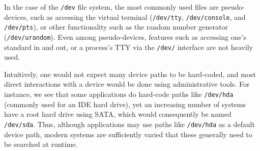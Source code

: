 


In the case of the {\tt /dev} file system, the most commonly used files are pseudo-devices, such as accessing
the virtual terminal ({\tt /dev/tty}, {\tt /dev/console}, and {\tt /dev/pts}), or other functionality 
such as the random number generator ({\tt /dev/urandom}).
Even among pseudo-devices, features such as accessing one's standard in and out, or a process's TTY
via the {\tt /dev/} interface are not heavily used.

Intuitively, one would not expect many device paths to be hard-coded, and most direct interactions 
with a device would be done using administrative tools.
For instance, we see that some applications do hard-code paths like {\tt /dev/hda} (commonly used for an IDE hard drive),
yet an increasing number of systems have a root hard drive using SATA, which would consequently be named {\tt /dev/sda}.
Thus, although applications may use paths like {\tt /dev/hda} as a default device path, modern systems are sufficiently varied
that these generally need to be searched at runtime.


